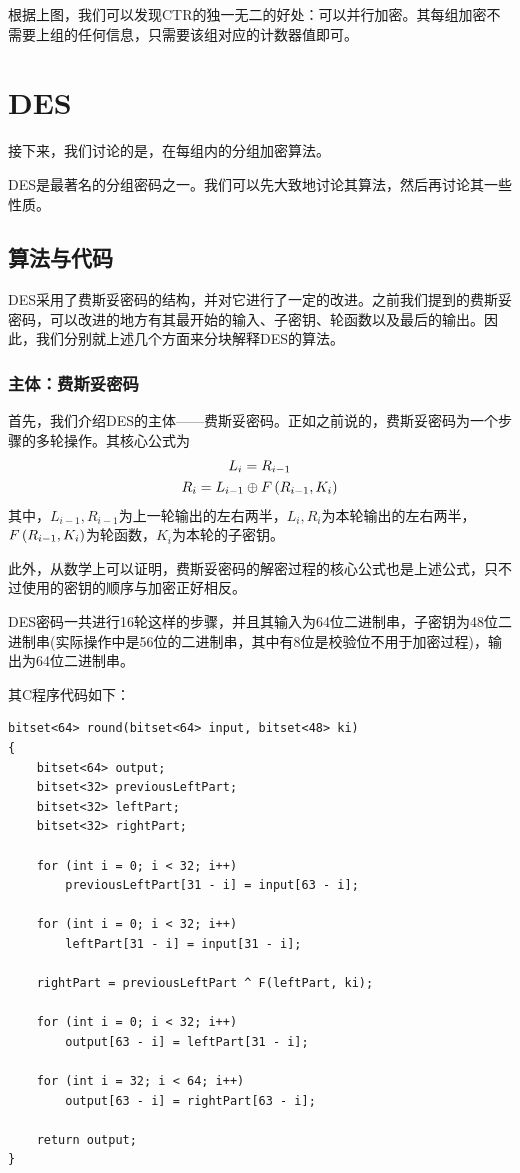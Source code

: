 根据上图，我们可以发现CTR的独一无二的好处：可以并行加密。其每组加密不需要上组的任何信息，只需要该组对应的计数器值即可。
\section{DES}
接下来，我们讨论的是，在每组内的分组加密算法。\par
DES是最著名的分组密码之一。我们可以先大致地讨论其算法，然后再讨论其一些性质。
\subsection{算法与代码}
DES采用了费斯妥密码的结构，并对它进行了一定的改进。之前我们提到的费斯妥密码，可以改进的地方有其最开始的输入、子密钥、轮函数以及最后的输出。因此，我们分别就上述几个方面来分块解释DES的算法。
\subsubsection{主体：费斯妥密码}
首先，我们介绍DES的主体——费斯妥密码。正如之前说的，费斯妥密码为一个步骤的多轮操作。其核心公式为
\begin{gather}
    L_{i}=R_{i-1}\\
    R_{i}=L_{i-1}\oplus F\left( {R_{i-1}, K_i}\right)
\end{gather}
其中，$L_{i-1}, R_{i-1}$为上一轮输出的左右两半，$L_i, R_i$为本轮输出的左右两半，$F\left( {R_{i-1}, K_i}\right)$为轮函数，$K_i$为本轮的子密钥。\par
此外，从数学上可以证明，费斯妥密码的解密过程的核心公式也是上述公式，只不过使用的密钥的顺序与加密正好相反。\par
DES密码一共进行16轮这样的步骤，并且其输入为64位二进制串，子密钥为48位二进制串(实际操作中是56位的二进制串，其中有8位是校验位不用于加密过程)，输出为64位二进制串。\par
其C程序代码如下：
\begin{prove}
\begin{verbatim}
bitset<64> round(bitset<64> input, bitset<48> ki)
{
    bitset<64> output;
    bitset<32> previousLeftPart;
    bitset<32> leftPart;
    bitset<32> rightPart;
    
    for (int i = 0; i < 32; i++)
        previousLeftPart[31 - i] = input[63 - i];
    
    for (int i = 0; i < 32; i++)
        leftPart[31 - i] = input[31 - i];
    
    rightPart = previousLeftPart ^ F(leftPart, ki);
    
    for (int i = 0; i < 32; i++)
        output[63 - i] = leftPart[31 - i];
    
    for (int i = 32; i < 64; i++)
        output[63 - i] = rightPart[63 - i];

    return output;
}
\end{verbatim}
\end{prove}
